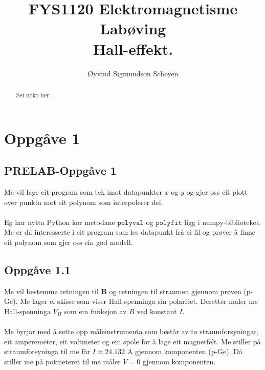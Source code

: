 \documentclass[11pt, a4paper]{article}
\newcommand{\vb}{\mathbf}
\begin{document}
\begin{titlepage}

  \title{\normalsize FYS1120 Elektromagnetisme\\
    \vspace{10mm}
    \huge Labøving\\
    \vspace{10mm}
    \normalsize{\bf Hall-effekt.}}

  \author{Øyvind Sigmundson Schøyen}

\end{titlepage}

\maketitle

\begin{abstract}
  Sei noko her.
\end{abstract}

\newpage
  \tableofcontents
\newpage

\section*{Oppgåve 1}

  \subsection*{PRELAB-Oppgåve 1}
    Me vil lage eit program som tek imot datapunkter $x$ og $y$ og gjer oss eit plott over punkta mot eit polynom som interpolerer dei. \\ \\
    Eg har nytta Python kor metodane $\texttt{polyval}$ og $\texttt{polyfit}$ ligg i numpy-biblioteket. Me er då interesserte i eit program som les datapunkt frå ei fil
    og prøver å finne eit polynom som gjer oss ein god modell.
    

  \subsection*{Oppgåve 1.1}
    Me vil bestemme retningen til $\vb{B}$ og retningen til straumen gjennom prøven (p-Ge). Me lager ei skisse som viser Hall-spenninga sin polaritet.
    Deretter måler me Hall-spenninga $V_{H}$ som ein funksjon av $B$ ved konstant $I$. \\ \\
    Me byrjar med å sette opp måleinstrumenta som består av to straumforsyningar, eit amperemeter, eit voltmeter og ein spole for å lage eit magnetfelt.
    Me stiller på straumforsyninga til me får $I \approx 24.132$ A gjennom komponenten (p-Ge). Då stiller me på potmeteret til me måler $V = 0$ gjennom komponenten.
\end{document}
